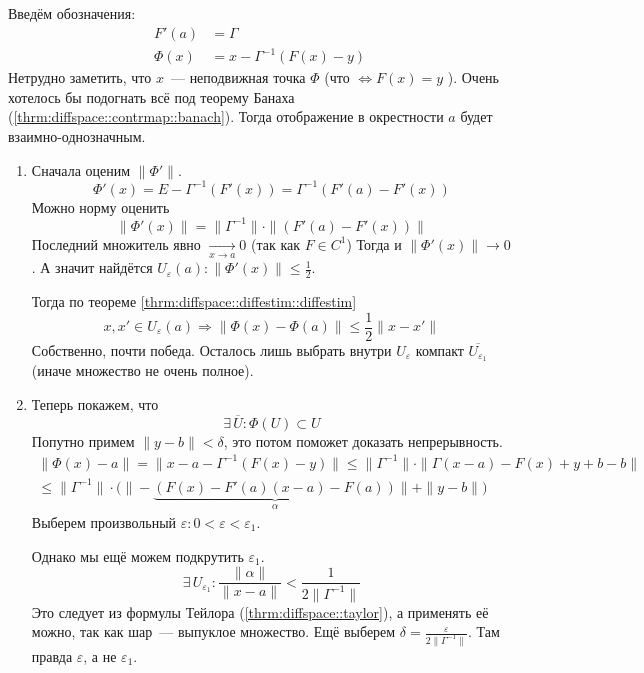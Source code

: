\documentclass[12pt,timbord]{../../../notes}
\begin{document}
\begin{ittproof}
  Введём обозначения:
  \begin{align*}
    F'(a) &= \Gamma\\
    \Phi(x) &= x - \Gamma^{-1} (F(x) - y)
  \end{align*}
  Нетрудно заметить, что $x$~--- неподвижная точка $\Phi$ (что $\Leftrightarrow F(x)=y$ ).
  Очень хотелось бы подогнать всё под теорему Банаха (\ref{thrm:diffspace::contrmap::banach}).
  Тогда отображение в окрестности $a$ будет взаимно-однозначным.

  \begin{enumerate}
    \item Сначала оценим $\|\Phi'\|$.
      \[
        \Phi'(x) = E - \Gamma^{-1} (F'(x)) = \Gamma^{-1} (F'(a) - F'(x))
      \]
      Можно норму оценить
      \[
        \|\Phi'(x)\| = \| \Gamma^{-1} \| \cdot \| (F'(a) - F'(x)) \|
      \]
      Последний множитель явно $\xrightarrow[x\to a]{} 0$ (так как $F\in C^1$)
      Тогда и $\|\Phi'(x)\|\to 0$. А значит найдётся $U_\varepsilon(a) \colon 
      \|\Phi'(x)\| \leqslant \frac{1}{2}$.
      
      Тогда по теореме \ref{thrm:diffspace::diffestim::diffestim} 
      \[
        x, x' \in U_\varepsilon(a) \Rightarrow \| \Phi(x) - \Phi(a)\| \leqslant \frac{1}{2}
        \|x-x'\|
      \]
      Собственно, почти победа. Осталось лишь выбрать внутри $U_\varepsilon$ компакт
      $\overline{U_{\varepsilon_1}}$ (иначе множество не очень полное).

    \item Теперь покажем, что 
      \[
        \exists\, \overline{U} \colon \Phi(U) \subset U  
      \]
      Попутно примем $\|y-b\| < \delta$, это потом поможет доказать непрерывность.
      \[
        \begin{split}
          \|\Phi(x) - a\| = \| x - a - \Gamma^{-1}(F(x)-y)\| 
          \leqslant \|\Gamma^{-1}\| \cdot \| \Gamma (x-a) - F(x) + y + b - b\| \\ 
          \leqslant \|\Gamma^{-1}\| 
          \cdot \bigl(\| - \underbrace{( F(x) - F'(a)(x-a) - F(a) )}_{\alpha}\| + \| y - b\| \bigr)
        \end{split}
      \]
      Выберем произвольный $\varepsilon \colon 0 < \varepsilon < \varepsilon_1$.
      
      Однако мы ещё можем подкрутить $\varepsilon_1$. 
      \[
        \exists\, U_{\varepsilon_1} \colon \frac{\|\alpha\|}{\|x-a\|} < \frac{1}{2\|\Gamma^{-1}\|}
      \]
      Это следует из формулы Тейлора (\ref{thrm:diffspace::taylor}), а применять её можно, так
      как шар~--- выпуклое множество. Ещё выберем $\delta = \frac{\varepsilon}{2\|\Gamma^{-1}\|}$.
      Там правда $\varepsilon$, а не $\varepsilon_1$.


\end{enumerate}
\end{ittproof}
\end{document}
